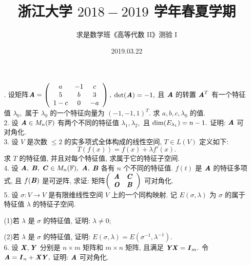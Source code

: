 \documentclass[UTF8]{ctexart}
\title{\LARGE \textbf{浙江大学 $2018-2019$ 学年春夏学期}}
\author{求是数学班《高等代数 II》测验 I}
\date{2019.03.22}
\begin{document}
. 设矩阵$\textbf{\textit{A}}=\left(\begin{array}{ccc}
                             a & -1 & c \\
                             5 & b & 3 \\
                             1-c & 0 & -a
                           \end{array}\right),$ ${\rm det}(\textbf{\textit{A}})=-1,$
且 $\textbf{\textit{A}}$ 的转置 $\textbf{\textit{A}}^T$ 有一个特征值 $\lambda_0,$ 属于 $\lambda_0$ 的一个特征向量为 $(-1,-1,1)^T.$ 求 $a,b,c,\lambda_0$ 的值.
\\

2. 设 $\textbf{\textit{A}}\in M_n(\mathbb{F})$ 有两个不同的特征值 $\lambda_1,\lambda_2,$ 且 ${\rm dim}(E_{\lambda_1})=n-1.$ 证明: $\textbf{\textit{A}}$ 可对角化.
\\

3. 设 $V$ 是次数 $\leq 2$ 的实多项式全体构成的线性空间, $T\in L(V)$ 定义如下:
\[ T\left(f(x)\right)=f(x)+\lambda f'(x).\]
求 $T$ 的特征值, 并且对每个特征值, 求属于它的特征子空间.
\\

4. 设  $\textbf{\textit{A}},$ $\textbf{\textit{B}},$  $\textbf{\textit{C}}\in M_n(\mathbb{F}),$  $\textbf{\textit{A}},$  $\textbf{\textit{B}}$ 各有 $n$ 个不同的特征值. $f(t)$ 是  $\textbf{\textit{A}}$ 的特征多项式, 且 $f(\textbf{\textit{B}})$ 是可逆阵, 求证: 矩阵$ \left(\begin{array} {cc}
\textbf{\textit{A}}  &  \textbf{\textit{C}}  \\
\textbf{\textit{O}}  &  \textbf{\textit{B}}
\end{array}\right)$ 可对角化.
\\

5. 设 $\sigma :V\longrightarrow V$ 是有限维线性空间 $V$ 上的一个同构映射. 记 $E(\sigma , \lambda)$ 为 $\sigma$ 的属于特征值 $\lambda$ 的特征子空间.

(1)若 $\lambda$ 是 $\sigma$ 的特征值, 证明: $\lambda \neq 0;$

(2)若 $\lambda$ 是 $\sigma$ 的特征值, 证明: $E(\sigma , \lambda)=E(\sigma ^{-1}, \lambda ^{-1}).$
\\

6. 设 $\textbf{\textit{X}},\textbf{\textit{Y}}$ 分别是 $n \times m$ 矩阵和 $m \times n$ 矩阵, 且满足 $\textbf{\textit{YX}}=\textbf{\textit{I}}_m.$ 令 $\textbf{\textit{A}}=\textbf{\textit{I}}_n+\textbf{\textit{XY}},$ 证明: $\textbf{\textit{A}}$ 可对角化.
\\
\end{document}
